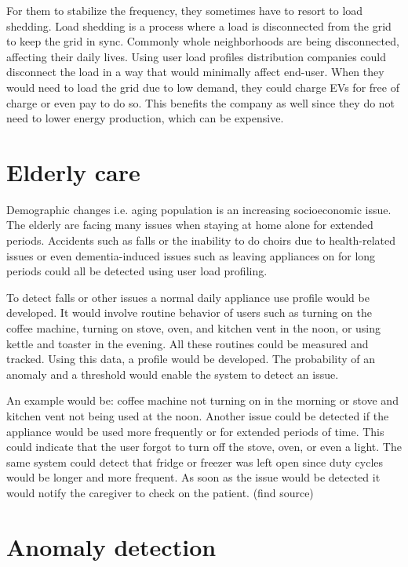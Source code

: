 \documentclass[
11pt, %
english, %
singlespacing, %
headsepline, %
]{MastersDoctoralThesis} %
\begin{document}
For them to stabilize the frequency, they sometimes have to resort to load shedding.
Load shedding is a process where a load is disconnected from the grid to keep the grid in sync.
Commonly whole neighborhoods are being disconnected, affecting their daily lives.
Using user load profiles distribution companies could disconnect the load in a way that would minimally affect end-user. 
When they would need to load the grid due to low demand, they could charge EVs for free of charge or even pay to do so. 
This benefits the company as well since they do not need to lower energy production, which can be expensive. 

\section{Elderly care}

Demographic changes i.e. aging population is an increasing socioeconomic issue.
The elderly are facing many issues when staying at home alone for extended periods.
Accidents such as falls or the inability to do choirs due to health-related issues or even dementia-induced issues 
such as leaving appliances on for long periods could all be detected using user load profiling.

To detect falls or other issues a normal daily appliance use profile would be developed.
It would involve routine behavior of users such as turning on the coffee machine, turning on stove, oven, and kitchen vent in the noon, or using kettle and toaster in the evening.
All these routines could be measured and tracked. Using this data, a profile would be developed.
The probability of an anomaly and a threshold would enable the system to detect an issue.

An example would be: coffee machine not turning on in the morning or stove and kitchen vent not being used at the noon.
Another issue could be detected if the appliance would be used more frequently or for extended periods of time. 
This could indicate that the user forgot to turn off the stove, oven, or even a light. The same system could detect 
that fridge or freezer was left open since duty cycles would be longer and more frequent. 
As soon as the issue would be detected it would notify the caregiver to check on the patient. (find source)

\section{Anomaly detection}
\end{document}
